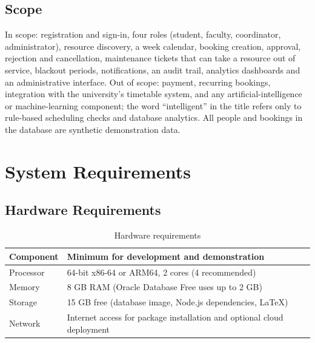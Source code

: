 \documentclass[12pt,a4paper,oneside]{report}
\renewcommand{\_}{\origus\allowbreak}
\begin{document}
\section{Scope}
In scope: registration and sign-in, four roles (student, faculty, coordinator, administrator), resource discovery, a week calendar, booking creation, approval, rejection and cancellation, maintenance tickets that can take a resource out of service, blackout periods, notifications, an audit trail, analytics dashboards and an administrative interface. Out of scope: payment, recurring bookings, integration with the university's timetable system, and any artificial-intelligence or machine-learning component; the word ``intelligent'' in the title refers only to rule-based scheduling checks and database analytics. All people and bookings in the database are synthetic demonstration data.

\chapter{System Requirements}

\section{Hardware Requirements}
\begin{table}[H]\centering
\caption{Hardware requirements}\label{tab:hw}
\begin{tabularx}{\linewidth}{@{}lX@{}}\toprule
Component & Minimum for development and demonstration\\\midrule
Processor & 64-bit x86-64 or ARM64, 2 cores (4 recommended)\\
Memory & 8 GB RAM (Oracle Database Free uses up to 2 GB)\\
Storage & 15 GB free (database image, Node.js dependencies, LaTeX)\\
Network & Internet access for package installation and optional cloud deployment\\\bottomrule
\end{tabularx}\end{table}
\end{document}
